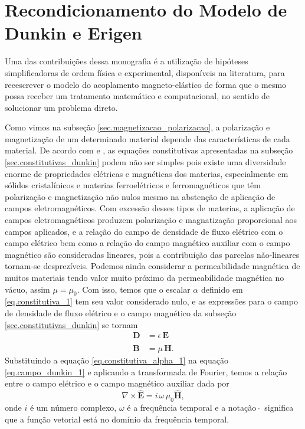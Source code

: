 \chapter{Recondicionamento do Modelo de Dunkin e Erigen}\label{sec.recon_model_dun_eri}
Uma das contribui\c{c}\~oes dessa monografia \'e a utiliza\c{c}\~ao de hip\'oteses simplificadoras de ordem f\'isica e experimental, dispon\'iveis na literatura, para reeescrever o modelo do acoplamento magneto-el\'astico de forma que o mesmo possa receber um tratamento matem\'atico e computacional, no sentido de solucionar um problema direto.

Como vimos na subse\c{c}\~ao \ref{sec.magnetizacao_polarizacao}, a polariza\c{c}\~ao e magnetiza\c{c}\~ao de um determinado material depende das caracter\'isticas de cada material. De acordo com \cite{jackson_classical_1999} e \cite{griffiths}, as equa\c{c}\~oes constitutivas apresentadas na subse\c{c}\~ao \ref{sec.constitutivas_dunkin} podem n\~ao ser simples pois existe uma diversidade enorme de propriedades el\'etricas e magn\'eticas dos materias, especialmente em s\'olidos cristal\'inicos  e materias ferroel\'etricos e ferromagn\'eticos que t\^em polariza\c{c}\~ao e magnetiza\c{c}\~ao n\~ao nulos mesmo na absten\c{c}\~ao de aplica\c{c}\~ao de campos eletromagn\'eticos. Com excess\~ao desses tipos de materias, a aplica\c{c}\~ao de campos eletromagn\'eticos produzem polariza\c{c}\~ao e magnatiza\c{c}\~ao proporcional aos campos aplicados, e a rela\c{c}\~ao do campo de densidade de fluxo el\'etrico com o campo el\'etrico bem como a rela\c{c}\~ao do campo magn\'etico auxiliar com o campo magn\'etico s\~ao consideradas lineares, pois a contribui\c{c}\~ao das parcelas n\~ao-lineares tornam-se desprez\'iveis. Podemos ainda considerar a permeabilidade magn\'etica de muitos materiais tendo valor muito pr\'oximo da permeabilidade magn\'etica no v\'acuo, assim $\mu=\mu_0$. Com isso, temos que o escalar $\alpha$ definido em \ref{eq.constitutiva_1} tem seu valor considerado nulo, e as express\~oes para o campo de densidade de fluxo el\'etrico e o campo magn\'etico da subse\c{c}\~ao \ref{sec.constitutivas_dunkin} se tornam
\begin{align}\label{eq.constitutiva_alpha_1}
\mathbf{D}&=\epsilon\,\mathbf{E}\\\nonumber\\\label{eq.constitutiva_alpha_2}
\mathbf{B}&=\mu\,\mathbf{H}.
\end{align}
Substituindo a equa\c{c}\~ao \ref{eq.constitutiva_alpha_1} na equa\c{c}\~ao \ref{eq.campo_dunkin_1} e aplicando a transformada de Fourier, temos a rela\c{c}\~ao entre o campo el\'etrico e o campo magn\'etico auxiliar dada por
\begin{equation}
\nabla\times\mathbf{\widehat{E}}=i\,\omega\,\mu_0\mathbf{\widehat{H}},
\end{equation}
onde $i$ \'e um n\'umero complexo, $\omega$ \'e a frequ\^encia temporal e a nota\c{c}\~ao $\widehat{\,\,}$ significa que a fun\c{c}\~ao vetorial est\'a no dom\'inio da frequ\^encia temporal.

